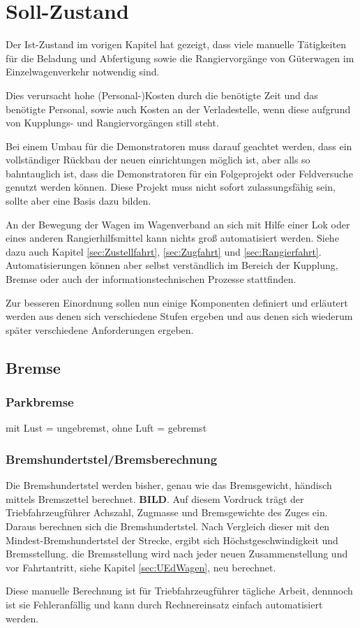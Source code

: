\section{Soll-Zustand}
Der Ist-Zustand im vorigen Kapitel hat gezeigt, dass viele manuelle Tätigkeiten für die Beladung und Abfertigung sowie die Rangiervorgänge von Güterwagen im Einzelwagenverkehr notwendig sind.\par
Dies verursacht hohe (Personal-)Kosten durch die benötigte Zeit und das benötigte Personal, sowie auch Kosten an der Verladestelle, wenn diese aufgrund von Kupplungs- und Rangiervorgängen still steht.\par
Bei einem Umbau für die Demonstratoren muss darauf geachtet werden, dass ein vollständiger Rückbau der neuen einrichtungen möglich ist, aber alls so bahntauglich ist, dass die Demonstratoren für ein Folgeprojekt oder Feldversuche genutzt werden können. Diese Projekt muss nicht sofort zulassungsfähig sein, sollte aber eine Basis dazu bilden. \par
An der Bewegung der Wagen im Wagenverband an sich mit Hilfe einer Lok oder eines anderen Rangierhilfsmittel kann nichts groß automatisiert werden. Siehe dazu auch Kapitel \ref{sec:Zustellfahrt}, \ref{sec:Zugfahrt} und \ref{sec:Rangierfahrt}. Automatisierungen können aber selbst verständlich im Bereich der Kupplung, Bremse oder auch der informationstechnischen Prozesse stattfinden.\par
Zur besseren Einordnung sollen nun einige Komponenten definiert und erläutert werden aus denen sich verschiedene Stufen ergeben und aus denen sich wiederum später verschiedene Anforderungen ergeben.

\subsection{Bremse}
\subsubsection{Parkbremse}
mit Lust = ungebremst, ohne Luft = gebremst
\subsubsection{Bremshundertstel/Bremsberechnung}
Die Bremshundertstel werden bisher, genau wie das Bremsgewicht, händisch mittels Bremszettel berechnet. \textbf{BILD}. Auf diesem Vordruck trägt der Triebfahrzeugführer Achszahl, Zugmasse und Bremsgewichte des Zuges ein. Daraus berechnen sich die Bremshundertstel. Nach Vergleich dieser mit den Mindest-Bremshundertstel der Strecke, ergibt sich Höchstgeschwindigkeit und Bremsstellung. die Bremsstellung wird nach jeder neuen Zusammenstellung und vor Fahrtantritt, siehe Kapitel \ref{sec:UEdWagen}, neu berechnet.\par
Diese manuelle Berechnung ist für Triebfahrzeugführer tägliche Arbeit, dennnoch ist sie Fehleranfällig und kann durch Rechnereinsatz einfach automatisiert werden.

